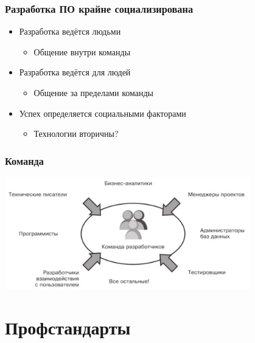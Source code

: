 \documentclass{../../slides-style}
\begin{document}
    \begin{frame}
        \frametitle{Разработка ПО крайне социализирована}
        \begin{itemize}
            \item Разработка ведётся людьми
            \begin{itemize}
                \item Общение внутри команды
            \end{itemize}
            \item Разработка ведётся для людей
            \begin{itemize}
                \item Общение за пределами команды
            \end{itemize}
            \item Успех определяется социальными факторами
            \begin{itemize}
                \item Технологии вторичны?
            \end{itemize}
        \end{itemize}
    \end{frame}

    \begin{frame}
        \frametitle{Команда}
        \begin{center}
            \includegraphics[width=0.8\textwidth]{team.png}
        \end{center}
    \end{frame}

    \section{Профстандарты}
\end{document}
